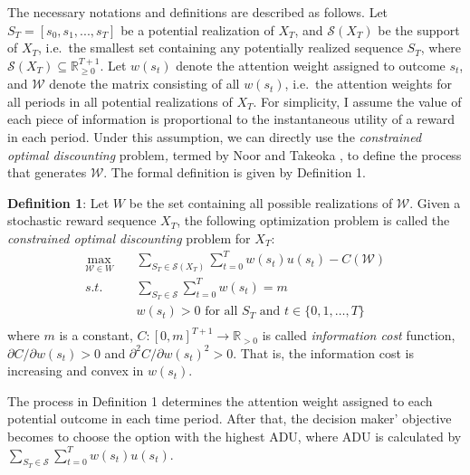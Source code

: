 \documentclass[
  12pt,
]{article}
\begin{document}
The necessary notations and definitions are described as follows. Let
\(S_T=[s_0,s_1,...,s_T]\) be a potential realization of \(X_T\), and
\(\mathcal{S}(X_T)\) be the support of \(X_T\), i.e.~the smallest set
containing any potentially realized sequence \(S_T\), where
\(\mathcal{S}(X_T)\subseteq \mathbb{R}_{\geq 0}^{T+1}\). Let \(w(s_t)\)
denote the attention weight assigned to outcome \(s_t\), and
\(\mathcal{W}\) denote the matrix consisting of all \(w(s_t)\), i.e.~the
attention weights for all periods in all potential realizations of
\(X_T\). For simplicity, I assume the value of each piece of information
is proportional to the instantaneous utility of a reward in each period.
Under this assumption, we can directly use the \emph{constrained optimal
discounting} problem\emph{,} termed by Noor and Takeoka
\citetext{\citeyear{noor_optimal_2022}; \citeyear{noor_constrained_2023}},
to define the process that generates \(\mathcal{W}\). The formal
definition is given by Definition 1.

\textbf{Definition 1}: Let \(W\) be the set containing all possible
realizations of \(\mathcal{W}\). Given a stochastic reward sequence
\(X_T\), the following optimization problem is called the
\emph{constrained optimal discounting} problem for \(X_T\):\[ 
\begin{aligned}
\max_{\mathcal{W}\in W}  \quad & \sum_{S_T\in \mathcal{S}(X_T)}\sum_{t=0}^T w(s_t)u(s_t) - C(\mathcal{W}) \\
s.t. \quad &  \sum_{S_T\in \mathcal{S}}\sum_{t=0}^T w(s_t)=m \\
& w(s_t)> 0 \text{ for all } S_T \text{ and } t\in\{0,1,…,T\} \\
\end{aligned}
\]where \(m\) is a constant,
\(C:[0,m]^{T+1}\rightarrow \mathbb{R}_{>0}\) is called \emph{information
cost} function, \(\partial C/\partial w(s_t)>0\) and
\(\partial^2 C/\partial w(s_t)^2>0\). That is, the information cost is
increasing and convex in \(w(s_t)\).

The process in Definition 1 determines the attention weight assigned to
each potential outcome in each time period. After that, the decision
maker' objective becomes to choose the option with the highest ADU,
where ADU is calculated by
\(\sum_{S_T\in\mathcal{S}}\sum_{t=0}^T w(s_t) u(s_t)\).
\end{document}
